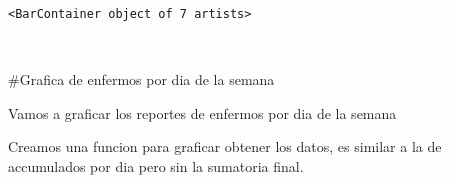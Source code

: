 \documentclass[11pt]{article}
\makeatletter
\newcommand{\boxspacing}{\kern\kvtcb@left@rule\kern\kvtcb@boxsep}
\newcommand{\prompt}[4]{
        \ttfamily\llap{{\color{#2}[#3]:\hspace{3pt}#4}}\vspace{-\baselineskip}
    }
\makeatother
\begin{document}
            \begin{tcolorbox}[breakable, size=fbox, boxrule=.5pt, pad at break*=1mm, opacityfill=0]
\prompt{Out}{outcolor}{16}{\boxspacing}
\begin{Verbatim}[commandchars=\\\{\}]
<BarContainer object of 7 artists>
\end{Verbatim}
\end{tcolorbox}
        
    \begin{center}
    \end{center}
    { \hspace*{\fill} \\}
    
    \#Grafica de enfermos por dia de la semana

Vamos a graficar los reportes de enfermos por dia de la semana

Creamos una funcion para graficar obtener los datos, es similar a la de
accumulados por dia pero sin la sumatoria final.
\end{document}
